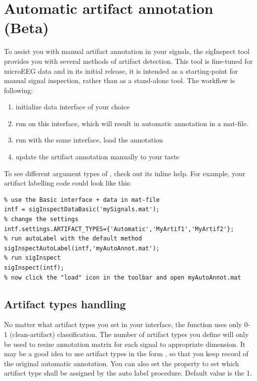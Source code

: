 \documentclass[a4paper,10pt]{article}
\begin{document}
\section{Automatic artifact annotation (Beta)}
To assist you with manual artifact annotation in your signals, the sigInspect tool provides you with several methods of artifact detection. This tool is fine-tuned for microEEG data and in its initial release, it is intended as a starting-point for manual signal inspection, rather than as a stand-alone tool. The workflow is following:
\begin{enumerate}
 \item initialize data interface of your choice 
 \item run  on this interface, which will result in automatic annotation in a mat-file.
 \item run  with the same interface, load the annotation
 \item update the artifact annotation manually to your taste
\end{enumerate}

To see different argument types of , check out its inline help. For example, your artifact labelling code could look like this:

\begin{lstlisting}
% use the Basic interface + data in mat-file
intf = sigInspectDataBasic('mySignals.mat');
% change the settings
intf.settings.ARTIFACT_TYPES={'Automatic','MyArtif1','MyArtif2'};
% run autoLabel with the default method
sigInspectAutoLabel(intf,'myAutoAnnot.mat');
% run sigInspect
sigInspect(intf);
% now click the "load" icon in the toolbar and open myAutoAnnot.mat
\end{lstlisting}

\subsection{Artifact types handling}
No matter what artifact types you set in your interface, the   function uses only 0-1 (clean-artifact) classification. The number of artifact types you define will only be used to resize annotation matrix for each signal to appropriate dimension. It may be a good idea to use artifact types in the form , so that you keep record of the original automatic annotation. You can also set the property  to set which artifact type shall be assigned by the auto label procedure. Default value is the 1.
\end{document}
